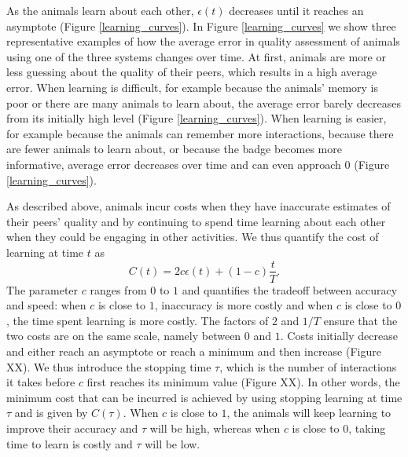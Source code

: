 As the animals learn about each other, $\epsilon(t)$ decreases until it reaches an asymptote (Figure \ref{learning_curves}). In Figure \ref{learning_curves} we show three representative examples of how the average error in quality assessment of animals using one of the three systems changes over time. At first, animals are more or less guessing about the quality of their peers, which results in a high average error. When learning is difficult, for example because the animals' memory is poor or there are many animals to learn about, the average error barely decreases from its initially high level (Figure \ref{learning_curves}). When learning is easier, for example because the animals can remember more interactions, because there are fewer animals to learn about, or because the badge becomes more informative, average error decreases over time and can even approach $0$ (Figure \ref{learning_curves}).  %

As described above, animals incur costs when they have inaccurate estimates of their peers' quality and by continuing to spend time learning about each other when they could be engaging in other activities. We thus quantify the cost of learning at time $t$ as 
\begin{equation*}
C(t) = 2c\epsilon(t) +(1-c)\frac{t}{T}.
\end{equation*}  
The parameter $c$ ranges from $0$ to $1$ and quantifies the tradeoff between accuracy and speed: when $c$ is close to $1$, inaccuracy is more costly and when $c$ is close to $0$, the time spent learning is more costly. The factors of $2$ and $1/T$ ensure that the two costs are on the same scale, namely between $0$ and $1$. 
Costs initially decrease and either reach an asymptote or reach a minimum and then increase (Figure XX). We thus introduce the stopping time $\tau$, which is the number of interactions it takes before $c$ first reaches its minimum value (Figure XX). In other words, the minimum cost that can be incurred is achieved by using stopping learning at time $\tau$ and is given by $C(\tau)$. When $c$ is close to $1$, the animals will keep learning to improve their accuracy and $\tau$ will be high, whereas when $c$ is close to $0$, taking time to learn is costly and $\tau$ will be low. 

